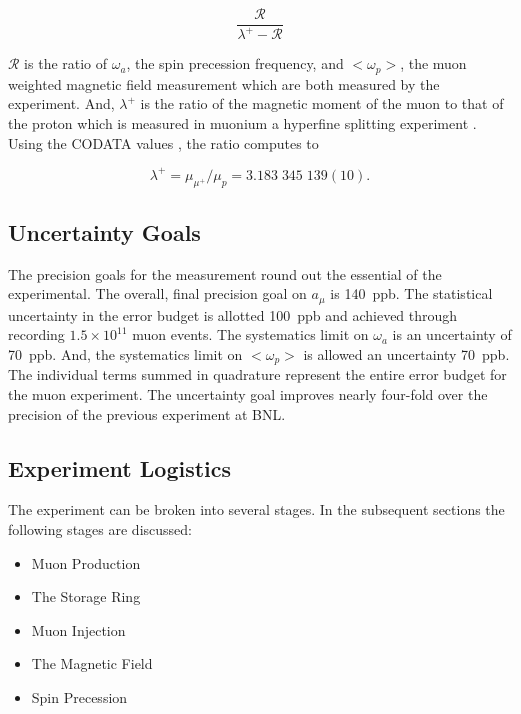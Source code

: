 \begin{equation}
\label{eqn:g-2-results-2}
\frac{\mathcal{R}}{\lambda^+ - \mathcal{R}}
\end{equation}

$\mathcal{R}$ is the ratio of $\omega_a$, the spin precession frequency, and $<\omega_p>$, the muon weighted magnetic field measurement which are both measured by the experiment. And, $\lambda^+$ is the ratio of the magnetic moment of the muon to that of the proton which is measured in muonium a hyperfine splitting experiment \cite{muonium-hyperfine}.  Using the CODATA values \cite{codata}, the ratio computes to

\begin{equation}
\label{eqn:muon-to-proton-mu-ratio}
\lambda^+ = \mu_{\mu^+} / \mu_p = 3.183\;345\;139(10).
\end{equation}

\subsection{Uncertainty Goals}

The precision goals for the measurement round out the essential of the experimental.  The overall, final precision goal on $a_\mu$ is \SI{140}{ppb}.  The statistical uncertainty in the error budget is allotted \SI{100}{ppb} and achieved through recording $1.5\times10^{11}$ muon events.  The systematics limit on $\omega_a$ is an uncertainty of \SI{70}{ppb}.  And, the systematics limit on $<\omega_p>$ is allowed an uncertainty \SI{70}{ppb}.  The individual terms summed in quadrature represent the entire error budget for the muon \gmtwo experiment.  The uncertainty goal improves nearly four-fold over the precision of the previous experiment at BNL.

\subsection{Experiment Logistics}

The \mugmtwo experiment can be broken into several stages.  In the subsequent sections the following stages are discussed:

\begin{itemize}[noitemsep]
\item{Muon Production}
\item{The Storage Ring}
\item{Muon Injection}
\item{The Magnetic Field}
\item{Spin Precession}
\end{itemize}

